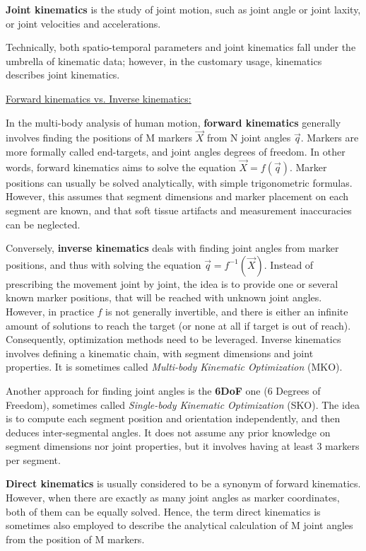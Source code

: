 \textbf{Joint kinematics} is the study of joint motion, such as joint angle or joint laxity, or joint velocities and accelerations.

Technically, both spatio-temporal parameters and joint kinematics fall under the umbrella of kinematic data; however, in the customary usage, kinematics describes joint kinematics.


\vspace*{0.5cm}
\noindent\underline{Forward kinematics vs. Inverse kinematics:}

In the multi-body analysis of human motion, \textbf{forward kinematics} generally involves finding the positions of M markers $\overrightarrow{X}$ from N joint angles $\overrightarrow{q}$. Markers are more formally called end-targets, and joint angles degrees of freedom. In other words, forward kinematics aims to solve the equation $\overrightarrow{X}=f(\overrightarrow{q})$. Marker positions can usually be solved analytically, with simple trigonometric formulas. However, this assumes that segment dimensions and marker placement on each segment are known, and that soft tissue artifacts and measurement inaccuracies can be neglected.

Conversely, \textbf{inverse kinematics} deals with finding joint angles from marker positions, and thus with solving the equation $\overrightarrow{q}=f^{-1}(\overrightarrow{X})$. Instead of prescribing the movement joint by joint, the idea is to provide one or several known marker positions, that will be reached with unknown joint angles. However, in practice $f$ is not generally invertible, and there is either an infinite amount of solutions to reach the target (or none at all if target is out of reach). Consequently, optimization methods need to be leveraged. Inverse kinematics involves defining a kinematic chain, with segment dimensions and joint properties. It is sometimes called \emph{Multi-body Kinematic Optimization} (MKO). 

Another approach for finding joint angles is the \textbf{6DoF} one (6 Degrees of Freedom), sometimes called \emph{Single-body Kinematic Optimization} (SKO). The idea is to compute each segment position and orientation independently, and then deduces inter-segmental angles. It does not assume any prior knowledge on segment dimensions nor joint properties, but it involves having at least 3 markers per segment.

\textbf{Direct kinematics} is usually considered to be a synonym of forward kinematics. However, when there are exactly as many joint angles as marker coordinates, both of them can be equally solved. Hence, the term direct kinematics is sometimes also employed to describe the analytical calculation of M joint angles from the position of M markers.





